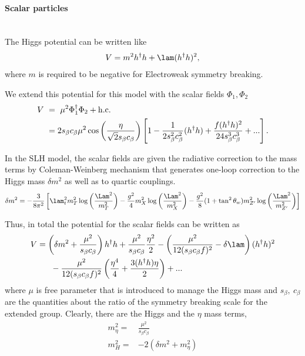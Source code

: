 \paragraph{Scalar particles}
\\
The Higgs potential can be written like
\begin{align}
 V=m^2 h^\dagger h + \lam (h^\dagger h )^2,
\end{align}
where $m$ is required to be negative for Electroweak symmetry breaking. 

We extend this potential for this model with the scalar fields $\Phi_1, \Phi_2$
\begin{align}
 V~&=~\mu^2 \Phi_1^\dagger \Phi_2 + {\rm{h.c.}}\nonumber\\
  & = 2s_\beta c_\beta \mu^2\cos\left( \frac{\eta}{\sqrt{2}s_\beta c_\beta} \right)
  \left[ 1-\frac{1}{2s_\beta^2 c_\beta^2}(h^\dagger h) + \frac{f(h^\dagger h)^2}{24s_\beta^3 c_\beta^3}+... \right].
\end{align}


In the SLH model, the scalar fields are given the radiative correction to the mass terms
by Coleman-Weinberg mechanism that generates one-loop correction to the Higgs mass $\delta m^2$
as well as to quartic couplings. 
\begin{align}
 \delta m^2 = -\frac{3}{8\pi^2}\left[ \lam_t^2 m_T^2 \log\left(\frac{\Lam^2}{m_T^2}\right)
  - \frac{g^2}{4} m_{X}^2\log\left(\frac{\Lam^2}{m_X^2}\right)
  - \frac{g^2}{8}(1+\tan^2\theta_w)m_{Z'}^2\log\left(\frac{\Lam^2}{m_{Z'}^2}\right) \right]
\end{align}


Thus, in total the potential for the scalar fields can be written as 
\begin{align}
 V &= \left(\delta m^2 + \frac{\mu^2}{s_\beta c_\beta}\right) h^\dagger h + \frac{\mu^2}{s_\beta c_\beta}\frac{\eta^2}{2}
  -\left(\frac{\mu^2}{12(s_\beta c_\beta f)^2} - \delta \lam\right)(h^\dagger h)^2 \nonumber\\
  &~~~~~- \frac{\mu^2}{12(s_\beta c_\beta f)^2} \left(\frac{\eta^4}{4} + \frac{3(h^\dagger h)\eta}{2} \right)+ ...
\end{align}
where $\mu$ is free parameter that is introduced to manage the Higgs mass 
and $s_\beta,~c_\beta$ are the quantities about the ratio of the symmetry breaking scale for the extended group.
Clearly, there are the Higgs and the $\eta$ mass terms,
\begin{align}
 m_\eta^2 =& \frac{\mu^2}{s_\beta c_\beta} \label{eq:etamass} \\
 m_H^2 =& -2(\delta m^2 + m_\eta^2) \label{eq:higgsmass}
\end{align}





